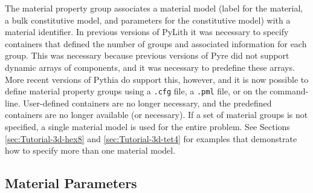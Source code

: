The material property group associates a material model (label for
the material, a bulk constitutive model, and parameters for the constitutive
model) with a material identifier. In previous versions of PyLith
it was necessary to specify containers that defined the number of
groups and associated information for each group. This was necessary
because previous versions of Pyre did not support dynamic arrays of
components, and it was necessary to predefine these arrays. More recent
versions of Pythia do support this, however, and it is now possible
to define material property groups using a \texttt{.cfg} file, a \texttt{.pml}
file, or on the command-line. User-defined containers are no longer
necessary, and the predefined containers are no longer available (or
necessary). If a set of material groups is not specified, a single
material model is used for the entire problem. See Sections \vref{sec:Tutorial-3d-hex8}
and \vref{sec:Tutorial-3d-tet4} for examples that demonstrate how
to specify more than one material model.


\subsection{\label{sec:material:parameters}Material Parameters}

